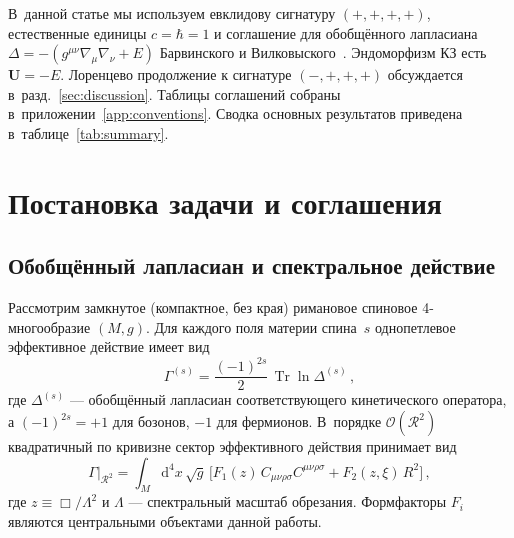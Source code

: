 \documentclass[aps,prd,twocolumn,superscriptaddress,nofootinbib,floatfix]{revtex4-2}
\theoremstyle{definition}
\theoremstyle{remark}
\newcommand{\Weylsq}{C_{\mu\nu\rho\sigma}C^{\mu\nu\rho\sigma}}
\newcommand{\dd}{\mathrm{d}}
\newcommand{\Tr}{\operatorname{Tr}}
\begin{document}
В~данной статье мы используем евклидову сигнатуру $(+,+,+,+)$, естественные
единицы $c = \hbar = 1$ и соглашение для обобщённого лапласиана
$\Delta = -(g^{\mu\nu}\nabla_\mu\nabla_\nu + E)$ Барвинского и
Вилковыского~\cite{Barvinsky:1985an}. Эндоморфизм КЗ есть
$\mathbf{U} = -E$. Лоренцево продолжение к сигнатуре $(-,+,+,+)$
обсуждается в~разд.~\ref{sec:discussion}. Таблицы соглашений собраны
в~приложении~\ref{app:conventions}. Сводка основных результатов приведена
в~таблице~\ref{tab:summary}.


\section{Постановка задачи и соглашения}
\label{sec:setup}

\subsection{Обобщённый лапласиан и спектральное действие}

Рассмотрим замкнутое (компактное, без края) римановое спиновое
4-многообразие $(M,g)$. Для каждого поля материи спина~$s$ однопетлевое
эффективное действие имеет вид
\begin{equation}
  \Gamma^{(s)} = \frac{(-1)^{2s}}{2}\,\Tr\ln\Delta^{(s)}\,,
  \label{eq:one-loop}
\end{equation}
где $\Delta^{(s)}$ --- обобщённый лапласиан соответствующего кинетического
оператора, а $(-1)^{2s} = +1$ для бозонов, $-1$ для фермионов. В~порядке
$\mathcal{O}(\mathcal{R}^2)$ квадратичный по кривизне сектор эффективного
действия принимает вид
\begin{equation}
  \Gamma\Big|_{\mathcal{R}^2}
  = \int_M \dd^4x\,\sqrt{g}\,\bigl[
    F_1(z)\,\Weylsq + F_2(z,\xi)\,R^2
  \bigr]\,,
  \label{eq:spectral-action}
\end{equation}
где $z \equiv \Box/\Lambda^2$ и $\Lambda$ --- спектральный масштаб обрезания.
Формфакторы $F_i$ являются центральными объектами данной работы.
\end{document}
